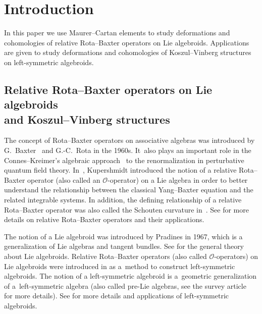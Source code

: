 \documentclass[pdftex]{sigma}%
\numberwithin{equation}{section}
\newcommand{\huaO}{\mathcal{O}}
\begin{document}


\section{Introduction}%

In this paper we use Maurer--Cartan elements to study deformations and cohomologies of relative Rota--Baxter operators on Lie algebroids. Applications are given to study deformations and cohomologies of Koszul--Vinberg structures on left-symmetric algebroids.

\subsection[Relative Rota--Baxter operators on Lie algebroids and Koszul--Vinberg structures]{Relative Rota--Baxter operators on Lie algebroids\\ and Koszul--Vinberg structures}

 The concept of Rota--Baxter operators on associative algebras was introduced by G.~Baxter~\cite{Ba} and G.-C.~Rota \cite{RotaI,RotaII} in the 1960s. It~also plays an important role in the Connes--Kreimer's algebraic approach~\cite{CK} to the renormalization in perturbative quantum field theory.
 In~\cite{Kuper1},
Kupershmidt introduced the notion of a relative Rota--Baxter operator (also called an $\huaO$-operator) on a Lie algebra in order to better understand the relationship between the classical Yang--Baxter equation and the related integrable systems. In addition, the defining relationship of a relative Rota--Baxter operator was also called the Schouten curvature in~\cite{Kos}. See \cite{Car,Fard,Gu0-1,Guo,Rota--Baxter_Lie_algebroid,PBG,Uchino2} for more details on relative Rota--Baxter operators and their applications.

 The notion of a Lie algebroid was introduced by Pradines in 1967, which
is a generalization of Lie algebras and tangent bundles.
See \cite{General-theory-of-Lie-groupoid-and-Lie-algebroid} for the general
theory about Lie algebroids. Relative Rota--Baxter operators (also called $\huaO$-operators) on Lie algebroids were introduced in \cite{LiuShengBaiChen} as a~method to construct left-symmetric algebroids. The notion of a left-symmetric algebroid is a~geometric generalization of a~left-symmetric algebra (also called pre-Lie algebras, see
the survey article~\cite{Pre-lie-algebra-in-geometry} for more details).
See \cite{BBo,LiuShengBaiChen,Boyom1,Boyom2} for more details and applications of left-symmetric algebroids.
\end{document}
